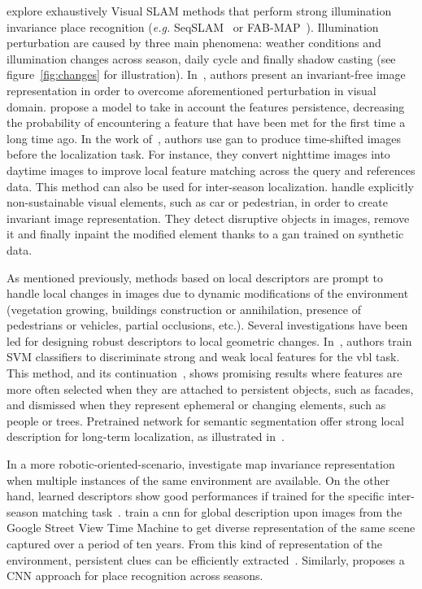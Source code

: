			\citet[Section VII]{Lowry2016} explore exhaustively Visual SLAM methods that perform strong illumination invariance place recognition (\textit{e.g.} SeqSLAM~\citep{Milford2012,Pepperell2014,Pepperell2016} or FAB-MAP~\citep{Cummins2008,Cummins2010,Paul2010}). Illumination perturbation are caused by three main phenomena: weather conditions and illumination changes across season, daily cycle and finally shadow casting (see figure~\ref{fig:changes} for illustration). In~\citep{Lowry2016a}, authors present an invariant-free image representation in order to overcome aforementioned perturbation in visual domain. \citet{Rosen2016} propose a model to take in account the features persistence, decreasing the probability of encountering a feature that have been met for the first time a long time ago. In the work of~\citet{Porav2018}, authors use \ac{gan} to produce time-shifted images before the localization task. For instance, they convert nighttime images into daytime images to improve local feature matching across the query and references data. This method can also be used for inter-season localization. \citet{Bescos2019} handle explicitly non-sustainable visual elements, such as car or pedestrian, in order to create invariant image representation. They detect disruptive objects in images, remove it and finally inpaint the modified element thanks to a \ac{gan} trained on synthetic data.
			
			As mentioned previously, methods based on local descriptors are prompt to handle local changes in images due to dynamic modifications of the environment (\eg vegetation growing, buildings construction or annihilation, presence of pedestrians or vehicles, partial occlusions, etc.). Several investigations have been led for designing robust descriptors to local geometric changes. In~\citep{Kim2015,Linegar2016}, authors train SVM classifiers to discriminate strong and weak local features for the \ac{vbl} task. This method, and its continuation~\citep{Kim2017}, shows promising results where features are more often selected when they are attached to persistent objects, such as facades, and dismissed when they represent ephemeral or changing elements, such as people or trees. Pretrained network for semantic segmentation offer strong local description for long-term localization, as illustrated in~\citep{Mousavian2015,Garg2018a,Toft2018,Shi2019,Schonberger2017a}.
			
			In a more robotic-oriented-scenario, \citet{Muhlfellner2015} investigate map invariance representation when multiple instances of the same environment are available. On the other hand, learned descriptors show good performances if trained for the specific inter-season matching task~\citep{Carlevaris-Bianco2014}. \citet{Arandjelovic2017} train a \ac{cnn} for global description upon images from the Google Street View Time Machine to get diverse representation of the same scene captured over a period of ten years. From this kind of representation of the environment, persistent clues can be efficiently extracted~\citep{Neubert2015}. Similarly, \citet{kumar2017condition} proposes a CNN approach for place recognition across seasons.
			
